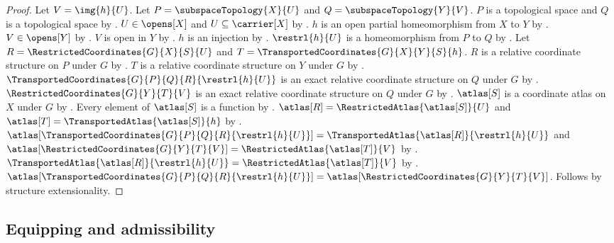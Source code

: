 \begin{proof}
    Let $V=\img{h}{U}$.
    Let $P=\subspaceTopology{X}{U}$ and $Q=\subspaceTopology{Y}{V}$.
    $P$ is a topological space and $Q$ is a topological space by .
    $U\in\opens[X]$ and $U\subseteq\carrier[X]$ by .
    $h$ is an open partial homeomorphism from $X$ to $Y$ by
        .
    $V\in\opens[Y]$ by .
    $V$ is open in $Y$ by .
    $h$ is an injection by .
    $\restrl{h}{U}$ is a homeomorphism from $P$ to $Q$ by .
    Let $R=\RestrictedCoordinates{G}{X}{S}{U}$ and $T=\TransportedCoordinates{G}{X}{Y}{S}{h}$.
    $R$ is a relative coordinate structure on $P$ under $G$ by .
    $T$ is a relative coordinate structure on $Y$ under $G$ by .
    $\TransportedCoordinates{G}{P}{Q}{R}{\restrl{h}{U}}$ is an exact relative coordinate structure
        on $Q$ under $G$ by .
    $\RestrictedCoordinates{G}{Y}{T}{V}$ is an exact relative coordinate structure
        on $Q$ under $G$ by .
    $\atlas[S]$ is a coordinate atlas on $X$ under $G$ by
        .
    Every element of $\atlas[S]$ is a function by
        .
    $\atlas[R]=\RestrictedAtlas{\atlas[S]}{U}$ and $\atlas[T]=\TransportedAtlas{\atlas[S]}{h}$ by
        .
    $\atlas[\TransportedCoordinates{G}{P}{Q}{R}{\restrl{h}{U}}]=\TransportedAtlas{\atlas[R]}{\restrl{h}{U}}$ and
        $\atlas[\RestrictedCoordinates{G}{Y}{T}{V}]=\RestrictedAtlas{\atlas[T]}{V}$ by
        .
    $\TransportedAtlas{\atlas[R]}{\restrl{h}{U}}=\RestrictedAtlas{\atlas[T]}{V}$ by
        .
    $\atlas[\TransportedCoordinates{G}{P}{Q}{R}{\restrl{h}{U}}]=\atlas[\RestrictedCoordinates{G}{Y}{T}{V}]$.
    Follows by structure extensionality.
\end{proof}

\subsection{Equipping and admissibility}


